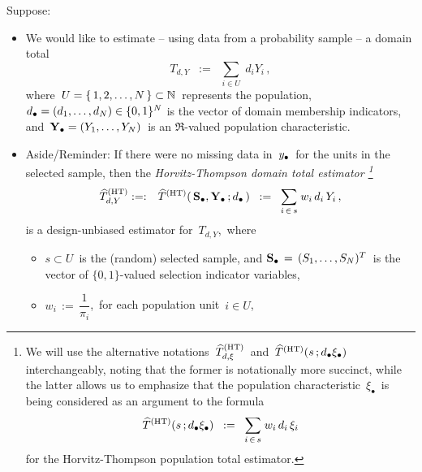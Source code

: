 Suppose:
\begin{itemize}
\item
    We would like to estimate
    -- using data from a probability sample --
    a domain total
    \begin{equation*}
    T_{d,Y}
    \;\; := \;\;
        \underset{i \in U}{\sum}\;d_{i}Y_{i}\,,
    \end{equation*}
    where \,$U = \{\,1,2,\ldots,N\,\} \subset \mathbb{N}$\, represents the population,
    $d_{\bullet} = (d_{1},\ldots,d_{N}) \in \{0,1\}^{N}$ is the vector of domain membership indicators,
    and
    \,$\mathbf{Y}_{\bullet} = (Y_{1},\ldots,Y_{N})$\,
    is an $\Re$-valued population characteristic.
\item
    Aside/Reminder:
    \vskip 0.01cm
    \noindent
    If there were no missing data in \,$y_{\bullet}$\, for the units in the selected sample,
    then the \textit{Horvitz-Thompson domain total estimator\! \footnote{
        We will use the alternative notations
        \,$\widehat{T}_{d,\xi}^{\textnormal{(HT)}}$\,
        and
        \,$\widehat{T}^{\textnormal{(HT)}}(s\,;d_{\bullet}\xi_{\bullet})$\,
        interchangeably, noting that the former is notationally more succinct,
        while the latter allows us to emphasize that the population characteristic
        \,$\xi_{\bullet}$\,
        is being considered as an argument to the formula
        \begin{equation*}
        \widehat{T}^{\textnormal{(HT)}}(s\,;d_{\bullet}\xi_{\bullet})
        \;\; := \;\;
            \underset{i\,\in\,s}{\sum}\;w_{i}\,d_{i}\,\xi_{i}
        \end{equation*}
        for the Horvitz-Thompson population total estimator.
        }
    }
    \begin{eqnarray*}
    \widehat{T}^{\textnormal{(HT)}}_{d,Y}
    & :=: &
        \widehat{T}^{\textnormal{(HT)}}(\,\mathbf{S}_{\bullet},\mathbf{Y}_{\bullet}\,;d_{\bullet}\,)
    \;\; := \;\;
        \underset{i\,\in\,s}{\sum}\;w_{i}\,d_{i}\,Y_{i}\,,
    \end{eqnarray*}
    is a design-unbiased estimator for
    \,$T_{d,Y}$,\,
    where
    \begin{itemize}
    \item
        $s \subset U$\, is the (random) selected sample, and
        $\mathbf{S}_{\bullet} \,=\, (S_{1},\ldots,S_{N})^{T}$\,
        is the vector of $\{0,1\}$-valued selection indicator variables,
    \item
        $w_{i} \,:=\, \dfrac{1}{\pi_{i}}$,\, for each population unit \,$i \in U$,\,

\end{itemize}
\end{itemize}
